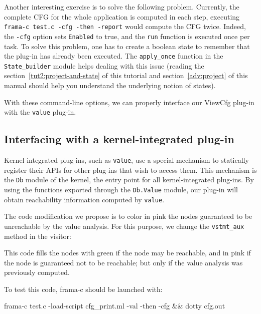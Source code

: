 Another interesting exercise is to solve the following problem.
Currently, the complete CFG for the whole application is computed in
each \framac step, \ie executing \texttt{frama-c test.c -cfg
  -then -report} would compute the CFG twice. Indeed, the
\texttt{-cfg} option sets \texttt{Enabled} to true, and the
\texttt{run} function is executed once per task. To solve this
problem, one has to create a boolean state to remember that the plug-in
has already been executed. The \texttt{apply\_once} function in the
\texttt{State\_builder} module helps dealing with this issue (reading
the section~\ref{tut2:project-and-state} of this tutorial and
section~\ref{adv:project} of this manual should help you understand the
underlying notion of states).

With these command-line options, we can properly interface our ViewCfg plug-in
with the \texttt{value} plug-in.

\subsection{Interfacing with a kernel-integrated plug-in}

Kernel-integrated plug-ins, such as \texttt{value}, use a special mechanism
to statically register their APIs for other plug-ins that wish to access them.
This mechanism is the \texttt{Db} module of the \framac kernel,
the entry point for all kernel-integrated plug-ins. By using the functions
exported through the \texttt{Db.Value} module, our plug-in will obtain
reachability information computed by \texttt{value}.

The code modification we propose is to color in pink the nodes guaranteed to
be unreachable by the value analysis. For this purpose, we change the
\texttt{vstmt\_aux} method in the visitor:


This code fills the nodes with green if the node may be
reachable, and in pink if the node is guaranteed not to be
reachable; but only if the value analysis was previously computed. 

To test this code, frama-c should be launched with:
\begin{shell}
  frama-c test.c -load-script cfg_print.ml -val -then -cfg && dotty cfg.out
\end{shell}

